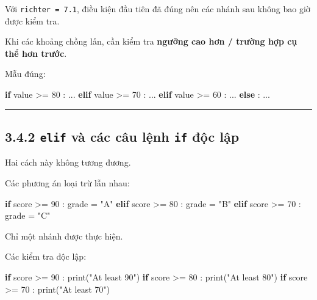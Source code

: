 \documentclass[
  11pt,
  a4paper,
]{article}
\newenvironment{Shaded}{}{}
\newcommand{\BuiltInTok}[1]{\textcolor[rgb]{0.00,0.50,0.00}{#1}}
\newcommand{\ControlFlowTok}[1]{\textcolor[rgb]{0.00,0.44,0.13}{\textbf{#1}}}
\newcommand{\DecValTok}[1]{\textcolor[rgb]{0.25,0.63,0.44}{#1}}
\newcommand{\NormalTok}[1]{#1}
\newcommand{\OperatorTok}[1]{\textcolor[rgb]{0.40,0.40,0.40}{#1}}
\newcommand{\StringTok}[1]{\textcolor[rgb]{0.25,0.44,0.63}{#1}}
\begin{document}
Với \texttt{richter\ =\ 7.1}, điều kiện đầu tiên đã đúng nên các nhánh
sau không bao giờ được kiểm tra.

Khi các khoảng chồng lấn, cần kiểm tra \textbf{ngưỡng cao hơn / trường
hợp cụ thể hơn trước}.

Mẫu đúng:

\begin{Shaded}
\begin{Highlighting}[]
\ControlFlowTok{if}\NormalTok{ value }\OperatorTok{\textgreater{}=} \DecValTok{80}\NormalTok{ :}
\NormalTok{    ...}
\ControlFlowTok{elif}\NormalTok{ value }\OperatorTok{\textgreater{}=} \DecValTok{70}\NormalTok{ :}
\NormalTok{    ...}
\ControlFlowTok{elif}\NormalTok{ value }\OperatorTok{\textgreater{}=} \DecValTok{60}\NormalTok{ :}
\NormalTok{    ...}
\ControlFlowTok{else}\NormalTok{ :}
\NormalTok{    ...}
\end{Highlighting}
\end{Shaded}

\begin{center}\rule{0.5\linewidth}{0.5pt}\end{center}

\subsection{\texorpdfstring{3.4.2 \texttt{elif} và các câu lệnh
\texttt{if} độc
lập}{3.4.2 elif và các câu lệnh if độc lập}}\label{elif-vuxe0-cuxe1c-cuxe2u-lux1ec7nh-if-ux111ux1ed9c-lux1eadp}

Hai cách này không tương đương.

Các phương án loại trừ lẫn nhau:

\begin{Shaded}
\begin{Highlighting}[]
\ControlFlowTok{if}\NormalTok{ score }\OperatorTok{\textgreater{}=} \DecValTok{90}\NormalTok{ :}
\NormalTok{    grade }\OperatorTok{=} \StringTok{"A"}
\ControlFlowTok{elif}\NormalTok{ score }\OperatorTok{\textgreater{}=} \DecValTok{80}\NormalTok{ :}
\NormalTok{    grade }\OperatorTok{=} \StringTok{"B"}
\ControlFlowTok{elif}\NormalTok{ score }\OperatorTok{\textgreater{}=} \DecValTok{70}\NormalTok{ :}
\NormalTok{    grade }\OperatorTok{=} \StringTok{"C"}
\end{Highlighting}
\end{Shaded}

Chỉ một nhánh được thực hiện.

Các kiểm tra độc lập:

\begin{Shaded}
\begin{Highlighting}[]
\ControlFlowTok{if}\NormalTok{ score }\OperatorTok{\textgreater{}=} \DecValTok{90}\NormalTok{ :}
    \BuiltInTok{print}\NormalTok{(}\StringTok{"At least 90"}\NormalTok{)}
\ControlFlowTok{if}\NormalTok{ score }\OperatorTok{\textgreater{}=} \DecValTok{80}\NormalTok{ :}
    \BuiltInTok{print}\NormalTok{(}\StringTok{"At least 80"}\NormalTok{)}
\ControlFlowTok{if}\NormalTok{ score }\OperatorTok{\textgreater{}=} \DecValTok{70}\NormalTok{ :}
    \BuiltInTok{print}\NormalTok{(}\StringTok{"At least 70"}\NormalTok{)}
\end{Highlighting}
\end{Shaded}
\end{document}
